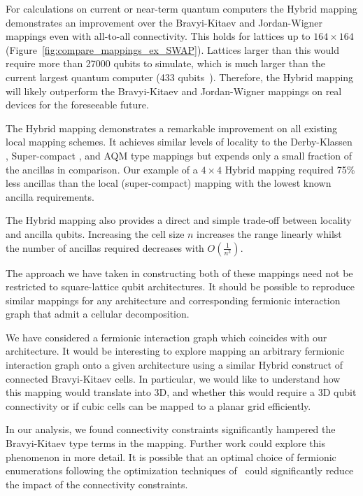 \documentclass[pdftex,pra,aps,twocolumn,twoside]{revtex4-2}
\theoremstyle{plain}
\theoremstyle{note}
\newcommand\+{{\footnotesize \raisebox{0.3ex}{+}}}
\begin{document}
For calculations on current or near-term quantum computers the Hybrid mapping demonstrates an improvement over the Bravyi-Kitaev and Jordan-Wigner mappings even with all-to-all connectivity. This holds for lattices up to $164 \times 164$ (Figure~\ref{fig:compare_mappings_ex_SWAP}). Lattices larger than this would require more than 27000 qubits to simulate, which is much larger than the current largest quantum computer (433 qubits~\cite{gambetta2020ibm}). Therefore, the Hybrid mapping will likely outperform the Bravyi-Kitaev and Jordan-Wigner mappings on real devices for the foreseeable future.

The Hybrid\+ mapping demonstrates a remarkable improvement on all existing local mapping schemes. It achieves similar levels of locality to the Derby-Klassen \cite{derby2021compact}, Super-compact \cite{chen2022equivalence}, and  AQM \cite{steudtner2019quantum} type mappings but expends only a small fraction of the ancillas in comparison. Our example of a $4 \times 4$ Hybrid\+ mapping required 75\% less ancillas than the local (super-compact) mapping with the lowest known ancilla requirements.

The Hybrid\+ mapping also provides a direct and simple trade-off between locality and ancilla qubits. Increasing the cell size $n$ increases the range linearly whilst the number of ancillas required decreases with $O(\frac{1}{n^2})$.

The approach we have taken in constructing both of these mappings need not be restricted to square-lattice qubit architectures. It should be possible to reproduce similar mappings for any architecture and corresponding fermionic interaction graph that admit a cellular decomposition.

We have considered a fermionic interaction graph which coincides with our architecture. It would be interesting to explore mapping an arbitrary fermionic interaction graph onto a given architecture using a similar Hybrid construct of connected Bravyi-Kitaev cells. In particular, we would like to understand how this mapping would translate into 3D, and whether this would require a 3D qubit connectivity or if cubic cells can be mapped to a planar grid efficiently.

In our analysis, we found connectivity constraints significantly hampered the Bravyi-Kitaev type terms in the mapping. Further work could explore this phenomenon in more detail. It is possible that an optimal choice of fermionic enumerations following the optimization techniques of~\cite{chiew2021optimal} could significantly reduce the impact of the connectivity constraints.
\end{document}
